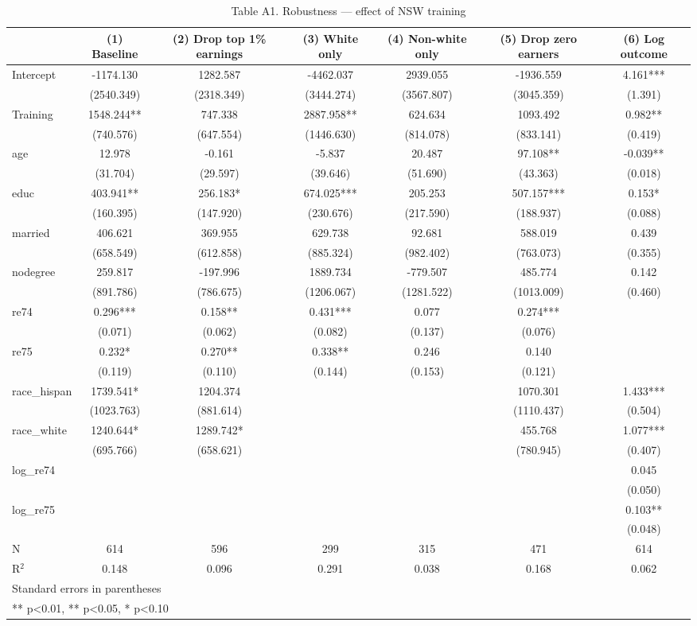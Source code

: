 \begin{table}[htbp]
\centering
\caption{Table A1. Robustness — effect of NSW training}
\begin{tabular}{lcccccc}
\hline\hline
 & (1) Baseline & (2) Drop top 1\% earnings & (3) White only & (4) Non-white only & (5) Drop zero earners & (6) Log outcome \\
\hline
Intercept & -1174.130 & 1282.587 & -4462.037 & 2939.055 & -1936.559 & 4.161*** \\
 & (2540.349) & (2318.349) & (3444.274) & (3567.807) & (3045.359) & (1.391) \\
Training & 1548.244** & 747.338 & 2887.958** & 624.634 & 1093.492 & 0.982** \\
 & (740.576) & (647.554) & (1446.630) & (814.078) & (833.141) & (0.419) \\
age & 12.978 & -0.161 & -5.837 & 20.487 & 97.108** & -0.039** \\
 & (31.704) & (29.597) & (39.646) & (51.690) & (43.363) & (0.018) \\
educ & 403.941** & 256.183* & 674.025*** & 205.253 & 507.157*** & 0.153* \\
 & (160.395) & (147.920) & (230.676) & (217.590) & (188.937) & (0.088) \\
married & 406.621 & 369.955 & 629.738 & 92.681 & 588.019 & 0.439 \\
 & (658.549) & (612.858) & (885.324) & (982.402) & (763.073) & (0.355) \\
nodegree & 259.817 & -197.996 & 1889.734 & -779.507 & 485.774 & 0.142 \\
 & (891.786) & (786.675) & (1206.067) & (1281.522) & (1013.009) & (0.460) \\
re74 & 0.296*** & 0.158** & 0.431*** & 0.077 & 0.274*** &  \\
 & (0.071) & (0.062) & (0.082) & (0.137) & (0.076) &  \\
re75 & 0.232* & 0.270** & 0.338** & 0.246 & 0.140 &  \\
 & (0.119) & (0.110) & (0.144) & (0.153) & (0.121) &  \\
race\_hispan & 1739.541* & 1204.374 &  &  & 1070.301 & 1.433*** \\
 & (1023.763) & (881.614) &  &  & (1110.437) & (0.504) \\
race\_white & 1240.644* & 1289.742* &  &  & 455.768 & 1.077*** \\
 & (695.766) & (658.621) &  &  & (780.945) & (0.407) \\
log\_re74 &  &  &  &  &  & 0.045 \\
 &  &  &  &  &  & (0.050) \\
log\_re75 &  &  &  &  &  & 0.103** \\
 &  &  &  &  &  & (0.048) \\
\hline
N & 614 & 596 & 299 & 315 & 471 & 614 \\
R$^2$ & 0.148 & 0.096 & 0.291 & 0.038 & 0.168 & 0.062 \\
\hline\hline
\multicolumn{7}{l}{\footnotesize Standard errors in parentheses} \\
\multicolumn{7}{l}{\footnotesize *** p<0.01, ** p<0.05, * p<0.10} \\
\end{tabular}
\end{table}